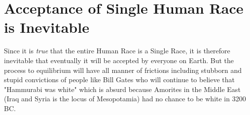 \documentclass{amsart}
\begin{document}
\section{Acceptance of Single Human Race is Inevitable}

Since it is {\em true} that the entire Human Race is a Single Race, it is therefore inevitable that eventually it will be accepted by everyone on Earth.  But the process to equilibrium will have all manner of frictions including stubborn and stupid convictions of people like Bill Gates who will continue to believe that "Hammurabi was white" which is absurd because Amorites in the Middle East (Iraq and Syria is the locus of Mesopotamia) had no chance to be white in 3200 BC.
\end{document}
